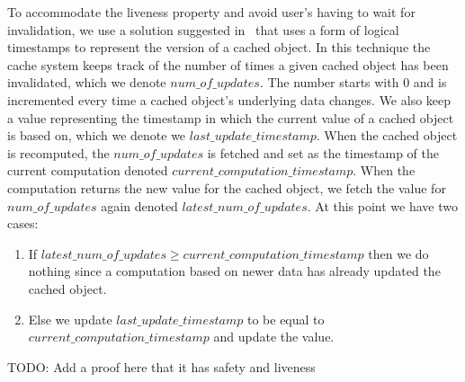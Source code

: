 To accommodate the liveness property and avoid user's having to wait for invalidation, we use a solution suggested in~\cite{paper:ibm-extended} that uses a form of logical timestamps to represent the version of a cached object. In this technique the cache system keeps track of the number of times a given cached object has been invalidated, which we denote $num\_of\_updates$. The number starts with $0$ and is incremented every time a cached object's underlying data changes.
We also keep a value representing the timestamp in which the current value of a cached object is based on, which we denote we $last\_update\_timestamp$. When the cached object is recomputed, the $num\_of\_updates$ is fetched and set as the timestamp of the current computation denoted $current\_computation\_timestamp$. When the computation returns the new value for the cached object, we fetch the value for $num\_of\_updates$ again denoted $latest\_num\_of\_updates$. At this point we have two cases:

\begin{enumerate}
  \item If $latest\_num\_of\_updates \geq current\_computation\_timestamp$ then we do nothing since a computation based on newer data has already updated the cached object.
  \item Else we update $last\_update\_timestamp$ to be equal to $current\_computation\_timestamp$ and update the value.
\end{enumerate}

TODO: Add a proof here that it has safety and liveness

